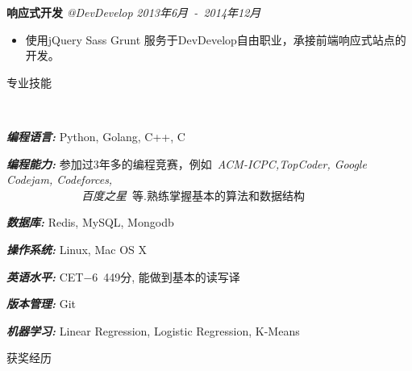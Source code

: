 ﻿\documentclass[9pt]{article}
\newenvironment{changemargin}[2]{%
  \begin{list}{}{%
    \setlength{\topsep}{0pt}%
    \setlength{\leftmargin}{#1}%
    \setlength{\rightmargin}{#2}%
    \setlength{\listparindent}{\parindent}%
    \setlength{\itemindent}{\parindent}%
    \setlength{\parsep}{\parskip}%
  }%
  \item[]}{\end{list}
}
\newcommand{\lineover}{
	\begin{changemargin}{-0.05in}{-0.05in}
		\vspace*{-8pt}
		\hrulefill \\
		\vspace*{-2pt}
	\end{changemargin}
}
\newcommand{\header}[1]{
	\begin{changemargin}{-0.5in}{-0.5in}
		\scshape{#1}\\
  	\lineover
	\end{changemargin}
}
\newenvironment{body} {
	\vspace*{-16pt}
	\begin{changemargin}{-0.25in}{-0.5in}
  }	
	{\end{changemargin}
}
\begin{document}
\begin{body}
    \textbf{响应式开发} \emph{@DevDevelop} \hfill \emph{2013年6月~-~2014年12月}\\
    \vspace*{-4pt}
    \begin{itemize} \itemsep -0pt  %
        \item 使用jQuery Sass Grunt 服务于DevDevelop自由职业，承接前端响应式站点的开发。
    \end{itemize}

\end{body}

\smallskip


\header{专业技能}

\begin{body}
	\vspace{14pt}
	\emph{\textbf{编程语言:}}{} Python, Golang, C++, C \\
	\medskip

    \emph{\textbf{编程能力:}}{} 参加过3年多的编程竞赛，例如~\emph{ACM-ICPC,TopCoder, Google Codejam, Codeforces, \\ ~~~~~~~~~~~~~百度之星}~等.熟练掌握基本的算法和数据结构\\
	\medskip

    \emph{\textbf{数据库:}}{} Redis, MySQL, Mongodb \\
    \medskip

	\emph{\textbf{操作系统:}}{} Linux, Mac OS X\\
    \medskip

    \emph{\textbf{英语水平:}}{} CET$-$6~449分, 能做到基本的读写译\\
    \medskip

    \emph{\textbf{版本管理:}}{} Git\\
    \medskip

    \emph{\textbf{机器学习:}}{} Linear Regression, Logistic Regression, K-Means

\end{body}

\smallskip

\header{获奖经历}
\end{document}
